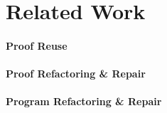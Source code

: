 \section{Related Work}

\paragraph{Proof Reuse}

\paragraph{Proof Refactoring \& Repair}

\paragraph{Program Refactoring \& Repair}
